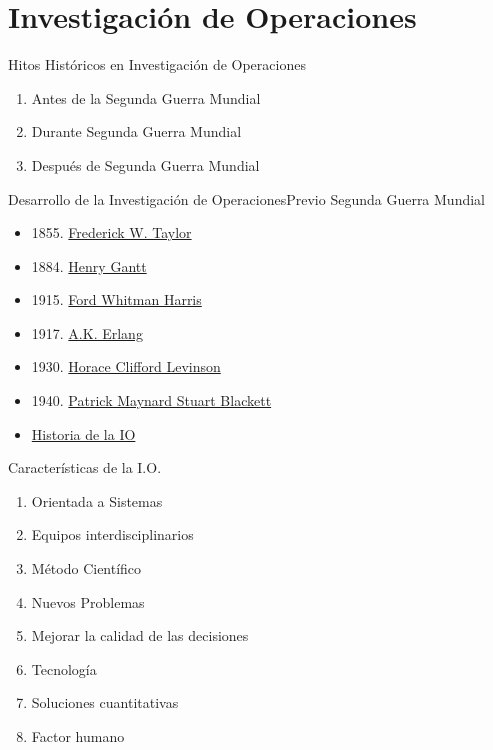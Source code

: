 \section{Investigación de Operaciones}
\label{sec:operations-research}

\begin{frame}{Hitos Históricos en Investigación de Operaciones}
  \begin{enumerate} \justifying \parskip3mm
  \item Antes de la Segunda Guerra Mundial
  \item Durante Segunda Guerra Mundial
  \item Después de Segunda Guerra Mundial 
  \end{enumerate}
\end{frame}

\begin{frame}{Desarrollo de la Investigación de Operaciones}{Previo Segunda Guerra Mundial}
  \begin{itemize} \justifying \parskip3mm
  \item<only@1> 1855. \href{https://en.wikipedia.org/wiki/Frederick_Winslow_Taylor}{Frederick W. Taylor}
  \item<only@1> 1884.  \href{https://en.wikipedia.org/wiki/Henry_Gantt}{Henry Gantt}
  \item<only@1> 1915. \href{https://en.wikipedia.org/wiki/Ford_Whitman_Harris}{Ford Whitman Harris}
  \item<only@1> 1917. \href{https://en.wikipedia.org/wiki/Agner_Krarup_Erlang}{A.K. Erlang}
  \item<only@1> 1930. \href{https://en.wikipedia.org/wiki/Horace_Clifford_Levinson}{Horace Clifford Levinson}
  \item<only@2> 1940. \href{https://www.informs.org/Explore/History-of-O.R.-Excellence/Biographical-Profiles/Blackett-Patrick-M.-S}{Patrick Maynard Stuart Blackett}
  \item<only@2> \href{https://www.youtube.com/watch?v=ILWbaWrjgU4}{Historia de la IO} 
  
  \end{itemize}
\end{frame}


\begin{frame}{Características de la I.O.}
  \begin{enumerate} \justifying \parskip3mm
  \item Orientada a Sistemas
  \item Equipos interdisciplinarios
  \item Método Científico
  \item Nuevos Problemas
  \item Mejorar la calidad de las decisiones
  \item Tecnología
  \item Soluciones cuantitativas
  \item Factor humano
  \end{enumerate}
\end{frame}

